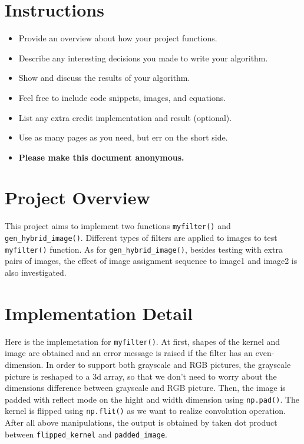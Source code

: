 \section*{Instructions}
\begin{itemize}
  \item Provide an overview about how your project functions. 
  \item Describe any interesting decisions you made to write your algorithm.
  \item Show and discuss the results of your algorithm.
  \item Feel free to include code snippets, images, and equations.
  \item List any extra credit implementation and result (optional).
  \item Use as many pages as you need, but err on the short side.
  \item \textbf{Please make this document anonymous.}
\end{itemize}

\section*{Project Overview}

This project aims to implement two functions \verb|myfilter()| and \verb|gen_hybrid_image()|. Different types of filters are applied to images to test \verb|myfilter()| function. As for \verb|gen_hybrid_image()|, besides testing with extra pairs of images, the effect of image assignment sequence to image1 and image2 is also investigated.

\section*{Implementation Detail}

Here is the implemetation for \verb|myfilter()|. At first, shapes of the kernel and image are obtained and an error message is raised if the filter has an even-dimension. In order to support both grayscale and RGB pictures, the grayscale picture is reshaped to a 3d array, so that we don't need to worry about the dimensions difference between grayscale and RGB picture. Then, the image is padded with reflect mode on the hight and width dimension using \verb|np.pad()|. The kernel is flipped using \verb|np.flit()| as we want to realize convolution operation. After all above manipulations, the output is obtained by taken dot product between \verb|flipped_kernel| and \verb|padded_image|. 

